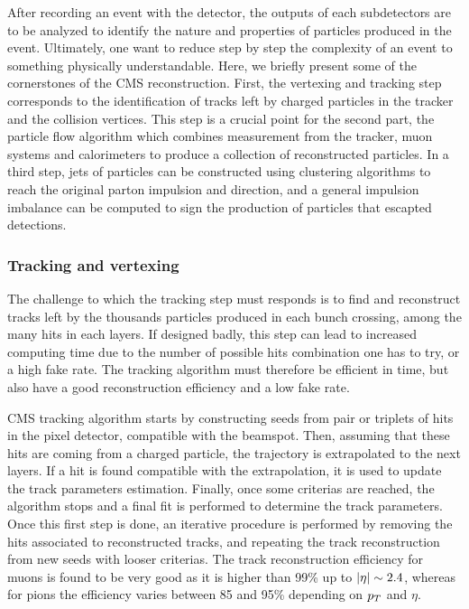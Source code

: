         After recording an event with the detector, the outputs of each subdetectors
        are to be analyzed to identify the nature and properties of particles produced in the
        event. Ultimately, one want to reduce step by step the complexity of an event to
        something physically understandable. Here, we briefly present some of the
        cornerstones of the CMS reconstruction. First, the vertexing and tracking step
        corresponds to the identification of tracks left by charged particles in the tracker
        and the collision vertices. This step is a crucial point for the second part, the
        particle flow algorithm which combines measurement from the tracker, muon systems
        and calorimeters to produce a collection of reconstructed particles. In a third step,
        jets of particles can be constructed using clustering algorithms to reach the original
        parton impulsion and direction, and a general impulsion imbalance can be computed
        to sign the production of particles that escapted detections.

            \subsubsection{Tracking and vertexing}

        The challenge to which the tracking step must responds is to find and reconstruct
        tracks left by the thousands particles produced in each bunch crossing, among the
        many hits in each layers. If designed badly, this step can lead to increased
        computing time due to the number of possible hits combination one has to try,
        or a high fake rate. The tracking algorithm must therefore be efficient in time,
        but also have a good reconstruction efficiency and a low fake rate.

        CMS tracking algorithm starts by constructing seeds from pair or triplets of hits
        in the pixel detector, compatible with the beamspot. Then, assuming that these
        hits are coming from a charged particle, the trajectory is extrapolated to the
        next layers. If a hit is found compatible with the extrapolation, it is used to
        update the track parameters estimation. Finally, once some criterias are reached,
        the algorithm stops and a final fit is performed to determine the track parameters.
        Once this first step is done, an iterative procedure is performed by removing the
        hits associated to reconstructed tracks, and repeating the track reconstruction
        from new seeds with looser criterias.
        The track reconstruction efficiency for muons is found to be very good as it is
        higher than 99\% up to $\left| \eta \right| \sim 2.4$, whereas for pions the efficiency varies
        between 85 and 95\% depending on $p_T$ and $\eta$.

